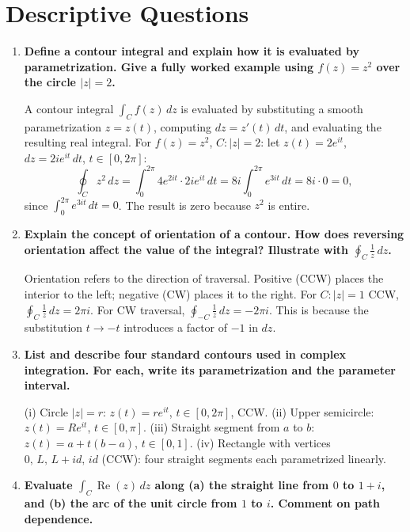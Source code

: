 \documentclass[12pt,a4paper]{article}
\begin{document}
\section{Descriptive Questions}

\begin{enumerate}[leftmargin=2em]

\item \textbf{Define a contour integral and explain how it is evaluated by parametrization.
Give a fully worked example using $f(z) = z^2$ over the circle $|z|=2$.}

A contour integral $\int_C f(z)\,dz$ is evaluated by substituting a smooth
parametrization $z = z(t)$, computing $dz = z'(t)\,dt$, and evaluating the
resulting real integral. For $f(z) = z^2$, $C: |z|=2$: let $z(t) = 2e^{it}$,
$dz = 2ie^{it}\,dt$, $t \in [0,2\pi]$:
\[
\oint_C z^2\,dz = \int_0^{2\pi}4e^{2it}\cdot 2ie^{it}\,dt
= 8i\int_0^{2\pi}e^{3it}\,dt = 8i\cdot 0 = 0,
\]
since $\int_0^{2\pi}e^{3it}\,dt = 0$. The result is zero because $z^2$ is entire.

\item \textbf{Explain the concept of orientation of a contour. How does reversing
orientation affect the value of the integral? Illustrate with $\oint_C \frac{1}{z}\,dz$.}

Orientation refers to the direction of traversal. Positive (CCW) places the
interior to the left; negative (CW) places it to the right. For $C: |z|=1$ CCW,
$\oint_C \frac{1}{z}\,dz = 2\pi i$. For CW traversal,
$\oint_{-C}\frac{1}{z}\,dz = -2\pi i$. This is because the substitution
$t \to -t$ introduces a factor of $-1$ in $dz$.

\item \textbf{List and describe four standard contours used in complex integration.
For each, write its parametrization and the parameter interval.}

(i) Circle $|z|=r$: $z(t)=re^{it}$, $t\in[0,2\pi]$, CCW.
(ii) Upper semicircle: $z(t)=Re^{it}$, $t\in[0,\pi]$.
(iii) Straight segment from $a$ to $b$: $z(t)=a+t(b-a)$, $t\in[0,1]$.
(iv) Rectangle with vertices $0,\,L,\,L+id,\,id$ (CCW): four straight segments
each parametrized linearly.

\item \textbf{Evaluate $\int_C \operatorname{Re}(z)\,dz$ along
(a) the straight line from $0$ to $1+i$, and (b) the arc of the unit circle
from $1$ to $i$. Comment on path dependence.}


\end{enumerate}
\end{document}
